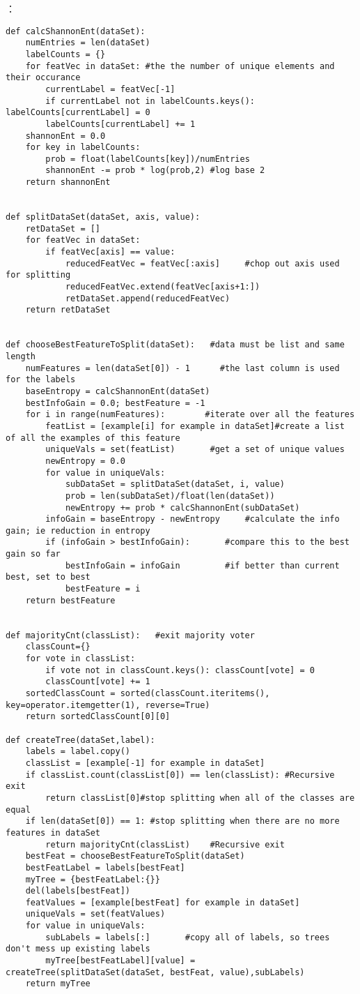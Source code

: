 ：
\begin{lstlisting}
def calcShannonEnt(dataSet):
    numEntries = len(dataSet)
    labelCounts = {}
    for featVec in dataSet: #the the number of unique elements and their occurance
        currentLabel = featVec[-1]
        if currentLabel not in labelCounts.keys(): labelCounts[currentLabel] = 0
        labelCounts[currentLabel] += 1
    shannonEnt = 0.0
    for key in labelCounts:
        prob = float(labelCounts[key])/numEntries
        shannonEnt -= prob * log(prob,2) #log base 2
    return shannonEnt


def splitDataSet(dataSet, axis, value):
    retDataSet = []
    for featVec in dataSet:
        if featVec[axis] == value:
            reducedFeatVec = featVec[:axis]     #chop out axis used for splitting
            reducedFeatVec.extend(featVec[axis+1:])
            retDataSet.append(reducedFeatVec)
    return retDataSet


def chooseBestFeatureToSplit(dataSet):   #data must be list and same length
    numFeatures = len(dataSet[0]) - 1      #the last column is used for the labels
    baseEntropy = calcShannonEnt(dataSet)
    bestInfoGain = 0.0; bestFeature = -1
    for i in range(numFeatures):        #iterate over all the features
        featList = [example[i] for example in dataSet]#create a list of all the examples of this feature
        uniqueVals = set(featList)       #get a set of unique values
        newEntropy = 0.0
        for value in uniqueVals:
            subDataSet = splitDataSet(dataSet, i, value)
            prob = len(subDataSet)/float(len(dataSet))
            newEntropy += prob * calcShannonEnt(subDataSet)
        infoGain = baseEntropy - newEntropy     #calculate the info gain; ie reduction in entropy
        if (infoGain > bestInfoGain):       #compare this to the best gain so far
            bestInfoGain = infoGain         #if better than current best, set to best
            bestFeature = i
    return bestFeature


def majorityCnt(classList):   #exit majority voter
    classCount={}
    for vote in classList:
        if vote not in classCount.keys(): classCount[vote] = 0
        classCount[vote] += 1
    sortedClassCount = sorted(classCount.iteritems(), key=operator.itemgetter(1), reverse=True)
    return sortedClassCount[0][0]

def createTree(dataSet,label):
    labels = label.copy()
    classList = [example[-1] for example in dataSet]
    if classList.count(classList[0]) == len(classList): #Recursive exit
        return classList[0]#stop splitting when all of the classes are equal
    if len(dataSet[0]) == 1: #stop splitting when there are no more features in dataSet
        return majorityCnt(classList)    #Recursive exit
    bestFeat = chooseBestFeatureToSplit(dataSet)
    bestFeatLabel = labels[bestFeat]
    myTree = {bestFeatLabel:{}}
    del(labels[bestFeat])
    featValues = [example[bestFeat] for example in dataSet]
    uniqueVals = set(featValues)
    for value in uniqueVals:
        subLabels = labels[:]       #copy all of labels, so trees don't mess up existing labels
        myTree[bestFeatLabel][value] = createTree(splitDataSet(dataSet, bestFeat, value),subLabels)
    return myTree



\end{lstlisting}
